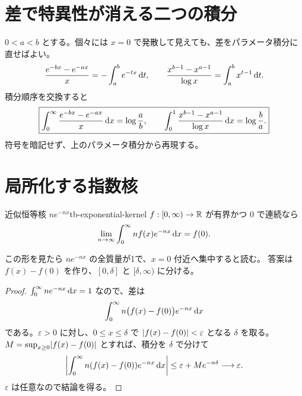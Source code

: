 \section{差で特異性が消える二つの積分}

$0<a<b$ とする。個々には $x=0$ で発散して見えても、差をパラメータ積分に直せばよい。
\[
\frac{e^{-bx}-e^{-ax}}x=-\int_a^b e^{-tx}\,\mathrm{d} t,
\qquad
\frac{x^{b-1}-x^{a-1}}{\log x}=\int_a^b x^{t-1}\,\mathrm{d} t.
\]
積分順序を交換すると
\[
\boxed{
\int_0^\infty\frac{e^{-bx}-e^{-ax}}x\,\mathrm{d} x=\log\frac ab,
\qquad
\int_0^1\frac{x^{b-1}-x^{a-1}}{\log x}\,\mathrm{d} x=\log\frac ba.}
\]
符号を暗記せず、上のパラメータ積分から再現する。

\section{局所化する指数核}

\begin{theorem}{近似恒等核 $ne^{-nx}$}{tb-exponential-kernel}
$f:[0,\infty)\to\mathbb{R}$ が有界かつ $0$ で連続なら
\[
\lim_{n\to\infty}\int_0^\infty n f(x)e^{-nx}\,\mathrm{d} x=f(0).
\]
\end{theorem}

この形を見たら $ne^{-nx}$ の全質量が1で、$x=0$ 付近へ集中すると読む。
答案は $f(x)-f(0)$ を作り、$[0,\delta]$ と $[\delta,\infty)$ に分ける。

\begin{proof}
$\int_0^\infty ne^{-nx}\,\mathrm{d} x=1$ なので、差は
\[
\int_0^\infty n\bigl(f(x)-f(0)\bigr)e^{-nx}\,\mathrm{d} x
\]
である。$\varepsilon>0$ に対し、$0\le x\le\delta$ で
$\lvert f(x)-f(0) \rvert<\varepsilon$ となる $\delta$ を取る。
$M=\sup_{x\ge0}\lvert f(x)-f(0) \rvert$ とすれば、積分を $\delta$ で分けて
\[
\left|\int_0^\infty n(f(x)-f(0))e^{-nx}\,\mathrm{d} x\right|
\le\varepsilon+Me^{-n\delta}\longrightarrow\varepsilon.
\]
$\varepsilon$ は任意なので結論を得る。
\end{proof}
